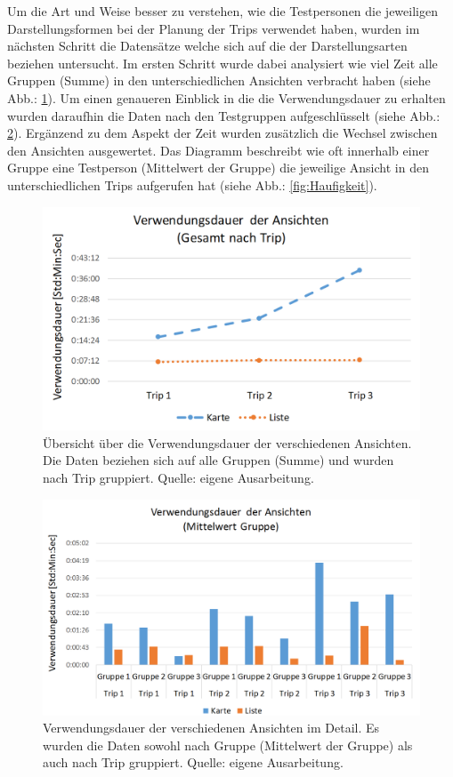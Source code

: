 \documentclass[Bachelorarbeit.tex]{subfiles}
\begin{document}
Um die Art und Weise besser zu verstehen, wie die Testpersonen die jeweiligen Darstellungsformen bei der Planung der Trips verwendet haben, wurden im nächsten Schritt die Datensätze welche sich auf die der Darstellungsarten beziehen untersucht. 
Im ersten Schritt wurde dabei analysiert wie viel Zeit alle Gruppen (Summe) in den unterschiedlichen Ansichten verbracht haben (siehe Abb.: \ref{fig:VerwendungsdauerTrip}).
Um einen genaueren Einblick in die die Verwendungsdauer zu erhalten wurden daraufhin die Daten nach den Testgruppen aufgeschlüsselt (siehe Abb.: \ref{fig:VerwendungsdauerGruppe}).
Ergänzend zu dem Aspekt der Zeit wurden zusätzlich die Wechsel zwischen den Ansichten ausgewertet. 
Das Diagramm beschreibt wie oft innerhalb einer Gruppe eine Testperson (Mittelwert der Gruppe) die jeweilige Ansicht in den unterschiedlichen Trips aufgerufen hat (siehe Abb.: \ref{fig:Haufigkeit}). 


\begin{figure}[H]
\centering
\includegraphics[width=0.7\linewidth]{img/Evaluation/Darstellungsformen/VerwendungsdauerTrip}
\caption[Verwendungsdauer der verschiedenen Ansichten.]{Übersicht über die Verwendungsdauer der verschiedenen Ansichten. Die Daten beziehen sich auf alle Gruppen (Summe) und wurden nach Trip gruppiert. Quelle: eigene Ausarbeitung.}
\label{fig:VerwendungsdauerTrip}
\end{figure}

\begin{figure}[H]
\centering
\includegraphics[width=0.7\linewidth]{img/Evaluation/Darstellungsformen/VerwendungsdauerGruppe}
\caption[Übersicht Verwendungsdauer Ansichten (Detail)]{Verwendungsdauer der verschiedenen Ansichten im Detail. Es wurden die Daten sowohl nach Gruppe (Mittelwert der Gruppe) als auch nach Trip gruppiert. Quelle: eigene Ausarbeitung.}
\label{fig:VerwendungsdauerGruppe}
\end{figure}
\end{document}
